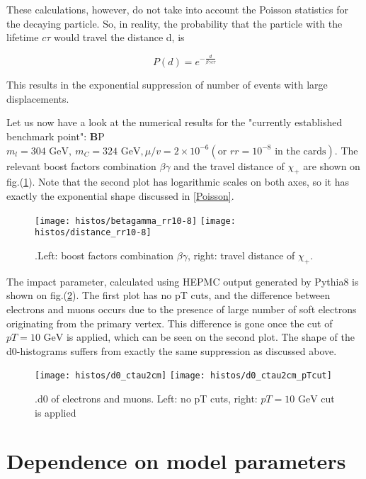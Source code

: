 \documentclass[12pt,letterpaper,notitlepage]{article}
\begin{document}
These calculations, however, do not take into account the Poisson statistics for the decaying particle. So, in reality, the probability that the particle with the lifetime $c \tau$ would travel the distance d, is

\begin{equation} \label{Poisson}
  P(d)=e^{-\frac{d}{\beta \gamma c \tau}}
\end{equation}

This results in the exponential suppression of number of events with large displacements.

Let us now have a look at the numerical results for the "currently established benchmark point":
{\textbf BP } $m_l = 304 \text{ GeV},\ m_C = 324\text{ GeV}, \mu/v=2 \times 10^{-6} (\text{or } rr=10^{-8} \text{ in the cards})$.
 The relevant boost factors combination $\beta \gamma$ and the travel distance of $\chi_+$ are shown on fig.(\ref{fig:boost-distance}). Note that the second plot has logarithmic scales on both axes, so it has exactly the exponential shape discussed in \ref{Poisson}.

\begin{figure}[h!]
\centering
\texttt{[image: histos/betagamma\_rr10-8]}
\texttt{[image: histos/distance\_rr10-8]}


\caption{\label{fig:boost-distance}.Left: boost factors combination $\beta \gamma$, right: travel distance of $\chi_+$.}
\end{figure}

The impact parameter, calculated using HEPMC output generated by Pythia8 is shown on fig.(\ref{fig:d0}). The first plot has no pT cuts, and the difference between electrons and muons occurs due to the presence of large number of soft electrons originating from the primary vertex. This difference is gone once the cut of $pT=10 \text{ GeV}$ is applied, which can be seen on the second plot. The shape of the d0-histograms suffers from exactly the same suppression as discussed above.

\begin{figure}[h!]
\centering
\texttt{[image: histos/d0\_ctau2cm]}
\texttt{[image: histos/d0\_ctau2cm\_pTcut]}


\caption{\label{fig:d0}.d0 of electrons and muons. Left: no pT cuts, right: $pT=10 \text{ GeV}$ cut is applied}
\end{figure}

\section{Dependence on model parameters}
\end{document}

